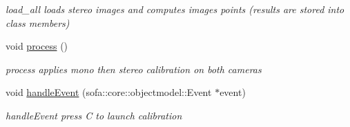 \begin{DoxyCompactItemize}
\begin{DoxyCompactList}\small\item\em load\+\_\+all loads stereo images and computes images points (results are stored into class members) \end{DoxyCompactList}\item 
\mbox{\label{classsofa_1_1rgbdtracking_1_1_multi_cam_calibrator_a50dace4711bcf01c8e8bcd317e414adb}} 
void \hyperlink{classsofa_1_1rgbdtracking_1_1_multi_cam_calibrator_a50dace4711bcf01c8e8bcd317e414adb}{process} ()
\begin{DoxyCompactList}\small\item\em process applies mono then stereo calibration on both cameras \end{DoxyCompactList}\item 
void \hyperlink{classsofa_1_1rgbdtracking_1_1_multi_cam_calibrator_af01cd89bb1d0974023fe015a6dc7fcff}{handle\+Event} (sofa\+::core\+::objectmodel\+::\+Event $\ast$event)
\begin{DoxyCompactList}\small\item\em handle\+Event press C to launch calibration \end{DoxyCompactList}\end{DoxyCompactItemize}
